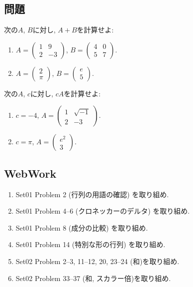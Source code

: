 \subsection{問題}
\begin{quiz}
  次の$A$, $B$に対し, $A+B$を計算せよ:
  \begin{enumerate}
  \item
    $A=\begin{pmatrix}1&9\\2&-3\end{pmatrix}$,
    $B=\begin{pmatrix}4&0\\5&7\end{pmatrix}$.
  \item 
    $A=\begin{pmatrix}2\\\pi\end{pmatrix}$,
    $B=\begin{pmatrix}e\\5\end{pmatrix}$.
  \end{enumerate}
\end{quiz}
\begin{quiz}
  次の$A$, $c$に対し, $cA$を計算せよ:
  \begin{enumerate}
  \item
    $c=-4$,
    $A=\begin{pmatrix}1&\sqrt{-1}\\2&-3\end{pmatrix}$.
  \item
    $c=\pi$,
    $A=\begin{pmatrix}e^2\\3\end{pmatrix}$.
  \end{enumerate}
\end{quiz}
\subsection{WebWork}
\begin{enumerate}
\item Set01 Problem 2 (行列の用語の確認) を取り組め.
\item Set01 Problem 4--6 (クロネッカーのデルタ) を取り組め.
\item Set01 Problem 8 (成分の比較) を取り組め.
\item Set01 Problem 14 (特別な形の行列) を取り組め.
\item Set02 Problem 2--3, 11--12, 20, 23--24 (和)を取り組め.
\item Set02 Problem 33--37 (和, スカラー倍)を取り組め.
\end{enumerate}


